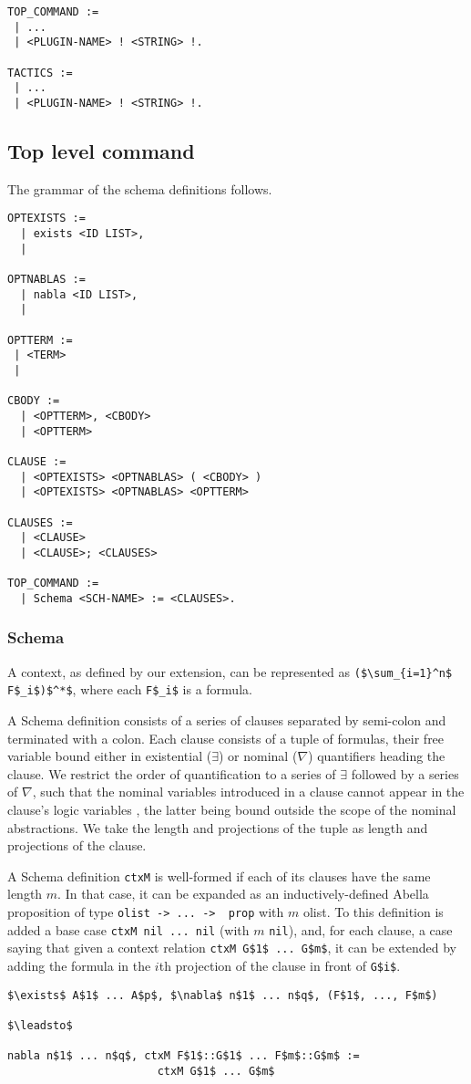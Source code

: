 \documentclass[nocopyrightspace,authoryear]{sigplanconf}
\begin{document}
\begin{lstlisting}
TOP_COMMAND :=
 | ...
 | <PLUGIN-NAME> ! <STRING> !.

TACTICS :=
 | ...
 | <PLUGIN-NAME> ! <STRING> !.
\end{lstlisting}



\subsection{Top level command}
The grammar of the schema definitions follows.

\begin{lstlisting}
OPTEXISTS :=
  | exists <ID LIST>, 
  |

OPTNABLAS :=
  | nabla <ID LIST>,
  |

OPTTERM :=
 | <TERM>
 | 

CBODY :=
  | <OPTTERM>, <CBODY>
  | <OPTTERM>

CLAUSE :=
  | <OPTEXISTS> <OPTNABLAS> ( <CBODY> )
  | <OPTEXISTS> <OPTNABLAS> <OPTTERM>

CLAUSES :=
  | <CLAUSE>
  | <CLAUSE>; <CLAUSES>

TOP_COMMAND :=
  | Schema <SCH-NAME> := <CLAUSES>.
\end{lstlisting} 

\subsubsection{Schema}
A context, as defined by our extension, can be represented as \lstinline|($\sum_{i=1}^n$ F$_i$)$^*$|, where each \lstinline|F$_i$| is a formula. 

A Schema definition consists of a series of clauses separated by semi-colon and terminated with a colon. Each clause consists of a tuple of formulas, their free variable bound either in existential ($\exists$) or  nominal ($\nabla$) quantifiers heading the clause. We restrict the order of quantification to a series of $\exists$ followed by a series of $\nabla$, such that the nominal variables introduced in a clause cannot appear in the clause's logic variables , the latter being bound outside the scope of the nominal abstractions. We take the length and projections of the tuple as length and projections of the clause.

A Schema definition \lstinline|ctxM| is well-formed if each of its clauses have the same length $m$. In that case, it can be expanded as an inductively-defined Abella proposition of type \lstinline|olist -> ... ->  prop| with $m$ olist. To this definition is added a base case \lstinline|ctxM nil ... nil| (with $m$ \lstinline|nil|), and, for each clause, a case saying that given a context relation \lstinline|ctxM G$1$ ... G$m$|, it can be extended by adding the formula in the $i$th projection of the clause in front of \lstinline|G$i$|.
\begin{lstlisting}
$\exists$ A$1$ ... A$p$, $\nabla$ n$1$ ... n$q$, (F$1$, ..., F$m$)

$\leadsto$

nabla n$1$ ... n$q$, ctxM F$1$::G$1$ ... F$m$::G$m$ := 
                       ctxM G$1$ ... G$m$
\end{lstlisting}
\end{document}

